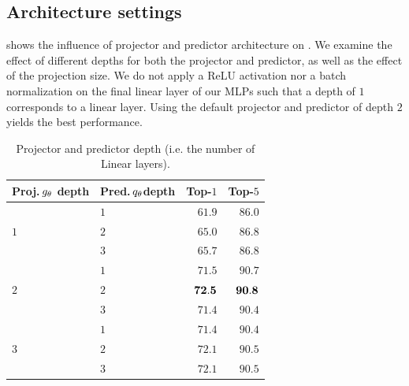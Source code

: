 \subsection{Architecture settings}
 shows the influence of projector and predictor architecture on \algo. We examine the effect of different depths for both the projector and predictor, as well as the effect of the projection size. We do not apply a ReLU activation nor a batch normalization on the final linear layer of our MLPs such that a depth of $1$ corresponds to a linear layer.  Using the default projector and predictor of depth $2$ yields the best performance. 

\begin{table}[ht!]
\begin{minipage}{.45\linewidth}
\begin{subtable}{\linewidth}
    \small
    \begin{center}
        \begin{tabular}{P{1cm}P{1cm}rr}
        \toprule
           Proj.\,$g_{\theta}$ \newline depth &   Pred.\,$q_{\theta}$\newline depth & Top-$1$     & Top-$5$   \\
        \midrule
                & $1$   & $61.9$        & $86.0$ \\
                                    & $2$   & $65.0$        & $86.8$  \\
                                    & $3$   & $65.7$        & $86.8$  \\ \midrule
                & $1$   & $71.5$        & $90.7$ \\
                                    & $2$   & $\bf{72.5}$   & $\bf{90.8}$ \\
                                    & $3$   & $71.4$        & $90.4$  \\ \midrule
                & $1$   & $71.4$        & $90.4$ \\
                                    & $2$   & $72.1$        & $90.5$  \\
                                    & $3$   & $72.1$        & $90.5$  \\
        \bottomrule
        \end{tabular}
         \caption{Projector and predictor depth (i.e. the number of Linear layers). }
        \label{table:ablation-proj-depth}
    \end{center}

\end{subtable}
\end{minipage}
\end{table}
